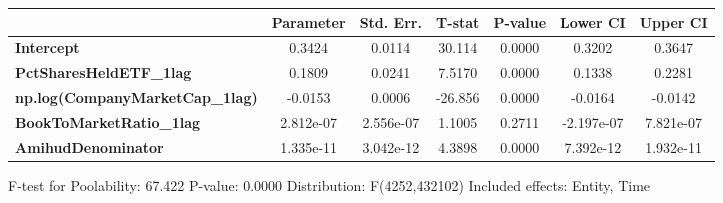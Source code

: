 \begin{center}
\begin{tabular}{lclc}
\bottomrule
\end{tabular}
\begin{tabular}{lcccccc}
                                        & \textbf{Parameter} & \textbf{Std. Err.} & \textbf{T-stat} & \textbf{P-value} & \textbf{Lower CI} & \textbf{Upper CI}  \\
\midrule
\textbf{Intercept}                      &       0.3424       &       0.0114       &      30.114     &      0.0000      &       0.3202      &       0.3647       \\
\textbf{PctSharesHeldETF\_1lag}         &       0.1809       &       0.0241       &      7.5170     &      0.0000      &       0.1338      &       0.2281       \\
\textbf{np.log(CompanyMarketCap\_1lag)} &      -0.0153       &       0.0006       &     -26.856     &      0.0000      &      -0.0164      &      -0.0142       \\
\textbf{BookToMarketRatio\_1lag}        &     2.812e-07      &     2.556e-07      &      1.1005     &      0.2711      &     -2.197e-07    &     7.821e-07      \\
\textbf{AmihudDenominator}              &     1.335e-11      &     3.042e-12      &      4.3898     &      0.0000      &     7.392e-12     &     1.932e-11      \\
\bottomrule
\end{tabular}
\end{center}

F-test for Poolability: 67.422 \newline
 P-value: 0.0000 \newline
 Distribution: F(4252,432102) \newline
  \newline
 Included effects: Entity, Time
